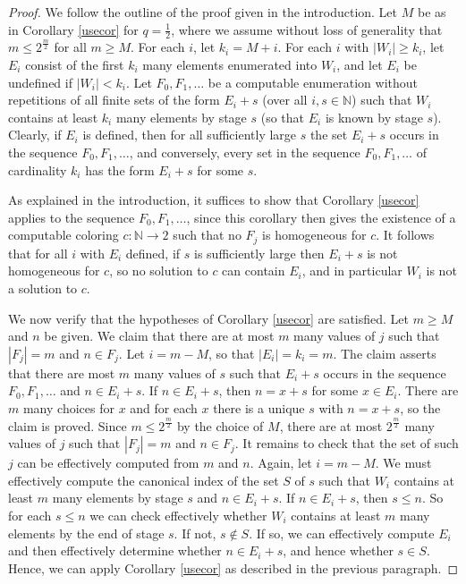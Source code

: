 \documentclass{amsart}
\theoremstyle{definition}
\renewcommand{\leq}{\leqslant}
\renewcommand{\geq}{\geqslant}
\begin{document}
\begin{proof}
We follow the outline of the proof given in the introduction. Let $M$
be as in Corollary \ref{usecor} for $q = \frac{1}{2}$, where we assume
without loss of generality that $m \leq 2^{\frac{m}{2}}$ for all $m
\geq M$. For each $i$, let $k_i = M + i$. For each $i$ with $|W_i|
\geq k_i$, let $E_i$ consist of the first $k_i$ many elements
enumerated into $W_i$, and let $E_i$ be undefined if $|W_i| <
k_i$. Let $F_0, F_1, \ldots$ be a computable enumeration without
repetitions of all finite sets of the form $E_i + s$ (over all $i, s
\in \mathbb N$) such that $W_i$ contains at least $k_i$ many elements
by stage $s$ (so that $E_i$ is known by stage $s$). Clearly, if $E_i$
is defined, then for all sufficiently large $s$ the set $E_i + s$
occurs in the sequence $F_0, F_1, \ldots$, and conversely, every set in
the sequence $F_0, F_1, \ldots$ of cardinality $k_i$ has the form $E_i
+ s$ for some $s$.

As explained in the introduction, it suffices to show that Corollary
\ref{usecor} applies to the sequence $F_0, F_1, \ldots$, since this
corollary then gives the existence of a computable coloring $c :
\mathbb N \rightarrow 2$ such that no $F_j$ is homogeneous for $c$. It
follows that for all $i$ with $E_i$ defined, if $s$ is sufficiently
large then $E_i + s$ is not homogeneous for $c$, so no solution to
$c$ can contain $E_i$, and in particular $W_i$ is not a solution to
$c$.

We now verify that the hypotheses of Corollary \ref{usecor} are
satisfied. Let $m \geq M$ and $n$ be given. We claim that there are at
most $m$ many values of $j$ such that $|F_j|=m$ and $n \in F_j$. Let
$i = m - M$, so that $|E_i| = k_i = m$. The claim asserts that there
are most $m$ many values of $s$ such that $E_i + s$ occurs in the
sequence $F_0, F_1, \ldots$ and $n \in E_i + s$. If $n \in E_i + s$,
then $n = x + s$ for some $x \in E_i$. There are $m$ many choices for
$x$ and for each $x$ there is a unique $s$ with $n = x + s$, so the
claim is proved. Since $m \leq 2^{\frac{m}{2}}$ by the choice of $M$,
there are at most $2^{\frac{m}{2}}$ many values of $j$ such that
$|F_j|=m$ and $n \in F_j$. It remains to check that the set of such
$j$ can be effectively computed from $m$ and $n$. Again, let $i = m -
M$. We must effectively compute the canonical index of the set $S$ of
$s$ such that $W_i$ contains at least $m$ many elements by stage $s$
and $n \in E_i + s$. If $n \in E_i + s$, then $s \leq n$. So for each
$s \leq n$ we can check effectively whether $W_i$ contains at least
$m$ many elements by the end of stage $s$. If not, $s \notin S$. If
so, we can effectively compute $E_i$ and then effectively determine
whether $n \in E_i + s$, and hence whether $s \in S$. Hence, we can
apply Corollary \ref{usecor} as described in the previous paragraph.
\end{proof}
\end{document}
